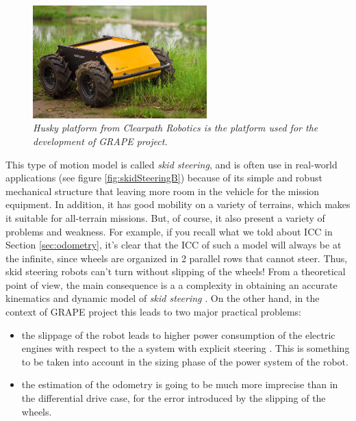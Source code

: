 \begin{figure}
	\centering
	\includegraphics[width=0.6\textwidth]{Images/background_and_tools/husky.png}
	\caption{\textit{Husky platform from Clearpath Robotics is the platform used for the development of \ac{GRAPE} project.}}
	\label{fig:husky}
\end{figure}

This type of motion model is called \textit{skid steering}, and is often use in real-world applications (see figure \ref{fig:skidSteeringB}) because of its simple and robust mechanical structure that leaving more room in the vehicle for the mission equipment. In
addition, it has good mobility on a variety of terrains, which makes it suitable
for all-terrain missions. But, of course, it also present a variety of problems and weakness. For example, if you recall what we told about \ac{ICC} in Section \ref{sec:odometry}, it's clear that the \ac{ICC} of such a model will always be at the infinite, since wheels are organized in 2 parallel rows that cannot steer. Thus, skid steering robots can't turn without slipping of the wheels! 
From a theoretical point of view, the main consequence is a a complexity in obtaining an accurate kinematics and dynamic model of \textit{skid steering} \parencite{skidSteeringDifficult}. On the other hand, in the context of \ac{GRAPE} project this leads to two major practical problems:
\begin{itemize}
	\item the slippage of the robot leads to higher power consumption of the electric engines with respect to the a system with explicit steering \parencite{skidSteeringConsumption}. This is something to be taken into account in the sizing phase of the power system of the robot.
	\item the estimation of the odometry is going to be much more imprecise than in the differential drive case, for the error introduced by the slipping of the wheels. 
\end{itemize}

